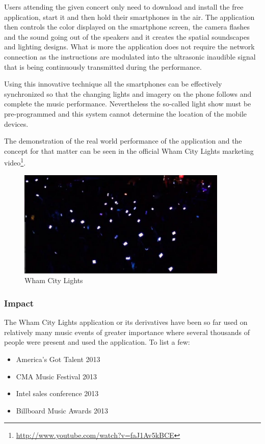 Users attending the given concert only need to download and install the free application, start it and then hold their smartphones in the air.
The application then controls the color displayed on the smartphone screen, the camera flashes and the sound going out of the speakers and it creates the spatial soundscapes and lighting designs.
What is more the application does not require the network connection as the instructions are modulated into the ultrasonic inaudible signal that is being continuously transmitted during the performance.

Using this innovative technique all the smartphones can be effectively synchronized so that the  changing lights and imagery on the phone follows and complete the music performance.
Nevertheless the so-called light show must be pre-programmed and this system cannot determine the location of the mobile devices.

The demonstration of the real world performance of the application and the concept for that matter can be seen in the official Wham City Lights marketing video\footnote{\url{http://www.youtube.com/watch?v=faJ1Av5kBCE}}.

\begin{figure}[!ht]
	\centering
		\includegraphics[width=10cm]{preliminaryStudies/wham_city_lights.jpg}
	\caption{Wham City Lights}
	\label{fig:wham_city_lights}
\end{figure}

\subsubsection{Impact}
The Wham City Lights application or its derivatives have been so far used on relatively many music events of greater importance where several thousands of people were present and used the application. To list a few:
\begin{itemize}
\item America's Got Talent 2013
\item CMA Music Festival 2013
\item Intel sales conference 2013
\item Billboard Music Awards 2013
\end{itemize}

